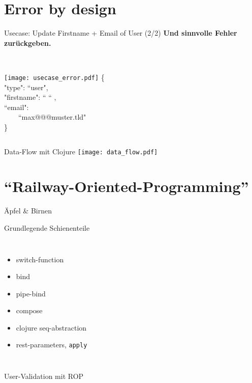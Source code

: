 \documentclass[compress]{beamer}
\begin{document}
\section{Error by design}
  \begin{frame}{Usecase: Update Firstname + Email of User (2/2)}
    \textbf{Und sinnvolle Fehler zurückgeben.}
    \begin{columns}[c]
    \\ \texttt{[image: usecase\_error.pdf]}
    \{\\
      "type": ``user",\\
      "firstname": `` `` ,\\
      ``email":\\
      ~~~~``max@@@muster.tld"\\
    \}
    \end{columns}
  \end{frame}
  \begin{frame}{Data-Flow mit Clojure}
     \texttt{[image: data\_flow.pdf]}
  \end{frame}

\section{"`Railway-Oriented-Programming"'}
\begin{frame}{Äpfel \& Birnen}
  \end{frame}
\begin{frame}{Grundlegende Schienenteile}
    \begin{columns}[c]
      \begin{itemize}
        \item switch-function
        \item<2-> bind
        \item<3-> pipe-bind
        \item<4-> compose
        \item<5-> clojure seq-abstraction
        \item<6-> rest-parameters, \texttt{apply}
      \end{itemize}
    \end{columns}
  \end{frame}
  \begin{frame}{User-Validation mit ROP}
  \end{frame}
\end{document}
